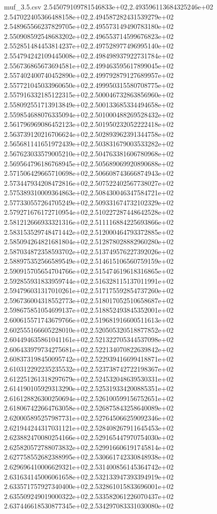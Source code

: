 \begin{filecontents*}{muf_3.5.csv}
2.545079109781546833e+02,2.493596113684325246e+02
2.547022405366488158e+02,2.494587282431539279e+02
2.548965566237829705e+02,2.495573149490783180e+02
2.550908592548683202e+02,2.496553714599676823e+02
2.552851484453814237e+02,2.497528977496995140e+02
2.554794242109445008e+02,2.498498937922731784e+02
2.556736865673694581e+02,2.499463595617899045e+02
2.557402400740452890e+02,2.499792879127689957e+02
2.557721045033960650e+02,2.499950315580708775e+02
2.557916332185122315e+02,2.500046732863856960e+02
2.558092551713913849e+02,2.500133685334494658e+02
2.559854688076335094e+02,2.501000488269528432e+02
2.561796969086452123e+02,2.501950232052222418e+02
2.563739120216706624e+02,2.502893962391344758e+02
2.565681141651972439e+02,2.503831679003533282e+02
2.567623033579005210e+02,2.504763381606780968e+02
2.569564796186768945e+02,2.505689069920890688e+02
2.571506429665710698e+02,2.506608743666874943e+02
2.573447934208472816e+02,2.507522402567738027e+02
2.575389310009364863e+02,2.508430046347584721e+02
2.577330557264705249e+02,2.509331674732102329e+02
2.579271676172710954e+02,2.510227287448642528e+02
2.581212666933321316e+02,2.511116884225693866e+02
2.583153529748471442e+02,2.512000464793372885e+02
2.585094264821681804e+02,2.512878028882960280e+02
2.587034872358593702e+02,2.513749576227392026e+02
2.588975352566589549e+02,2.514615106560759159e+02
2.590915705654704766e+02,2.515474619618316865e+02
2.592855931833959744e+02,2.516328115137011991e+02
2.594796031317010261e+02,2.517175592854737260e+02
2.596736004318552773e+02,2.518017052510658687e+02
2.598675851054699137e+02,2.518852493845352001e+02
2.600615571743679766e+02,2.519681916600511613e+02
2.602555166605228010e+02,2.520505320518877852e+02
2.604494635861041161e+02,2.521322705344537098e+02
2.606433979734275681e+02,2.522134070822639842e+02
2.608373198450095742e+02,2.522939416699418871e+02
2.610312292235235532e+02,2.523738742722198367e+02
2.612251261318297679e+02,2.524532048639530331e+02
2.614190105929313290e+02,2.525319334200885351e+02
2.616128826300250694e+02,2.526100599156752651e+02
2.618067422664763058e+02,2.526875843258640089e+02
2.620005895257987731e+02,2.527645066259092346e+02
2.621944244317031121e+02,2.528408267911645453e+02
2.623882470080254166e+02,2.529165447970754030e+02
2.625820572788073832e+02,2.529916606191745814e+02
2.627758552682388995e+02,2.530661742330848938e+02
2.629696410006629321e+02,2.531400856145364742e+02
2.631634145006061658e+02,2.532133947393394919e+02
2.633571757927340400e+02,2.532861015833696001e+02
2.635509249019000322e+02,2.533582061226070437e+02
2.637446618530877345e+02,2.534297083331030080e+02

\end{filecontents*}
